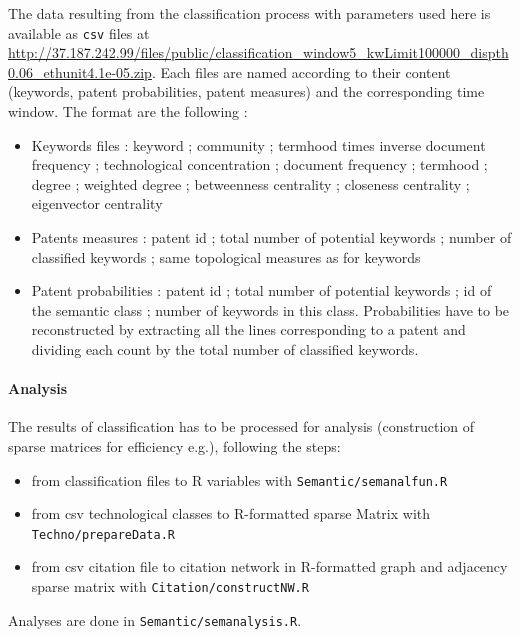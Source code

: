 \documentclass[12pt,twoside,a4paper]{article}
\begin{document}
The data resulting from the classification process with parameters used here is available as \texttt{csv} files at\\
 \url{http://37.187.242.99/files/public/classification_window5_kwLimit100000_dispth0.06_ethunit4.1e-05.zip}. Each files are named according to their content (keywords, patent probabilities, patent measures) and the corresponding time window. The format are the following :

\begin{itemize}
\item Keywords files : keyword ; community ; termhood times inverse document frequency ; technological concentration ; document frequency ; termhood ; degree ; weighted degree ; betweenness centrality ; closeness centrality ; eigenvector centrality
\item Patents measures : patent id ; total number of potential keywords ; number of classified keywords ; same topological measures as for keywords
\item Patent probabilities : patent id ; total number of potential keywords ; id of the semantic class ; number of keywords in this class. Probabilities have to be reconstructed by extracting all the lines corresponding to a patent and dividing each count by the total number of classified keywords.
\end{itemize}




\paragraph*{Analysis}

The results of classification has to be processed for analysis (construction of sparse matrices for efficiency e.g.), following the steps:
\begin{itemize}
\item from classification files to R variables with \texttt{Semantic/semanalfun.R}
\item from csv technological classes to R-formatted sparse Matrix with \texttt{Techno/prepareData.R} 
\item from csv citation file to citation network in R-formatted graph and adjacency sparse matrix with \texttt{Citation/constructNW.R}
\end{itemize}

Analyses are done in \texttt{Semantic/semanalysis.R}.



\newpage
\end{document}
